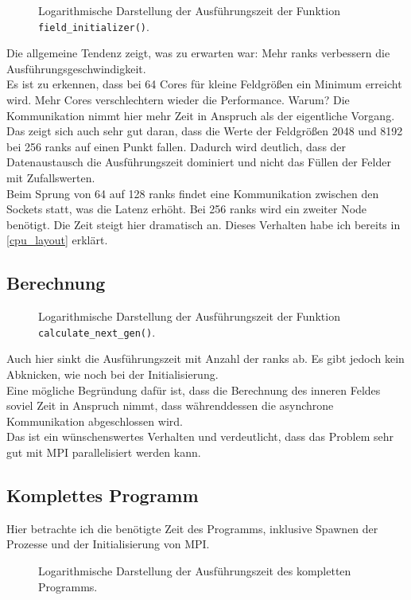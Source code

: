 \documentclass[german,plainarticle,hyperref,utf8]{zihpub}
\begin{document}
	\begin{figure}[h]
		\centering
		
		\caption{Logarithmische Darstellung der Ausführungszeit der Funktion \texttt{field\_initializer()}.}
	\end{figure}
	Die allgemeine Tendenz zeigt, was zu erwarten war: Mehr ranks verbessern die Ausführungsgeschwindigkeit.\\
	Es ist zu erkennen, dass bei 64 Cores für kleine Feldgrößen ein Minimum erreicht wird. Mehr Cores verschlechtern wieder die Performance. Warum? Die Kommunikation nimmt hier mehr Zeit in Anspruch als der eigentliche Vorgang.\\
	Das zeigt sich auch sehr gut daran, dass die Werte der Feldgrößen 2048 und 8192 bei 256 ranks auf einen Punkt fallen. Dadurch wird deutlich, dass der Datenaustausch die Ausführungszeit dominiert und nicht das Füllen der Felder mit Zufallswerten.\\
	Beim Sprung von 64 auf 128 ranks findet eine Kommunikation zwischen den Sockets statt, was die Latenz erhöht. Bei 256 ranks wird ein zweiter Node benötigt. Die Zeit steigt hier dramatisch an. Dieses Verhalten habe ich bereits in \ref{cpu_layout} erklärt.
	\subsection{Berechnung}
	\begin{figure}[h]
		\centering
		
		\caption{Logarithmische Darstellung der Ausführungszeit der Funktion \texttt{calculate\_next\_gen()}.}
	\end{figure}
	Auch hier sinkt die Ausführungszeit mit Anzahl der ranks ab. Es gibt jedoch kein Abknicken, wie noch bei der Initialisierung.\\
	Eine mögliche Begründung dafür ist, dass die Berechnung des inneren Feldes soviel Zeit in Anspruch nimmt, dass währenddessen die asynchrone Kommunikation abgeschlossen wird.\\
	Das ist ein wünschenswertes Verhalten und verdeutlicht, dass das Problem sehr gut mit MPI parallelisiert werden kann.
	\clearpage
	\subsection{Komplettes Programm}
	Hier betrachte ich die benötigte Zeit des Programms, inklusive Spawnen der Prozesse und der Initialisierung von MPI.
	\begin{figure}[h]
		\centering
		
		\caption{Logarithmische Darstellung der Ausführungszeit des kompletten Programms.}
	\end{figure}
\end{document}
